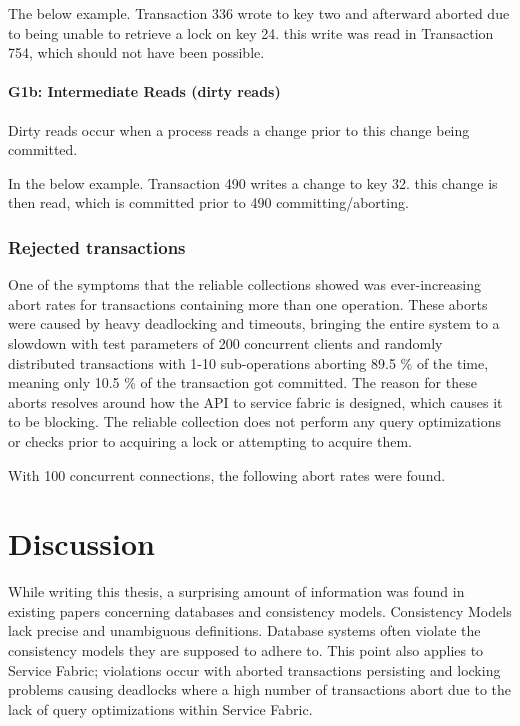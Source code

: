\documentclass[a4paper,10pt,titlepage]{report}
\begin{document}
The below example. Transaction 336 wrote to key two and afterward aborted due to being unable to retrieve a lock on key 24. this write was read in Transaction 754, which should not have been possible.






\newpage
\subsubsection{G1b: Intermediate Reads (dirty reads)}
Dirty reads occur when a process reads a change prior to this change being committed. 

In the below example.
Transaction 490 writes a change to key 32. this change is then read, which is committed prior to 490 committing/aborting.






\newpage
\subsection{Rejected transactions}

One of the symptoms that the reliable collections showed was ever-increasing abort rates for transactions containing more than one operation. These aborts were caused by heavy deadlocking and timeouts, bringing the entire system to a slowdown with test parameters of 200 concurrent clients and randomly distributed transactions with 1-10 sub-operations aborting 89.5 \% of the time, meaning only 10.5 \% of the transaction got committed. The reason for these aborts resolves around how the API to service fabric is designed, which causes it to be blocking. The reliable collection does not perform any query optimizations or checks prior to acquiring a lock or attempting to acquire them. 

With 100 concurrent connections, the following abort rates were found. 



\chapter{Discussion}

While writing this thesis, a surprising amount of information was found in existing papers concerning databases and consistency models. Consistency Models lack precise and unambiguous definitions. Database systems often violate the consistency models they are supposed to adhere to. This point also applies to Service Fabric; violations occur with aborted transactions persisting and locking problems causing deadlocks where a high number of transactions abort due to the lack of query optimizations within Service Fabric.\\ \vspace{5mm}
\end{document}
